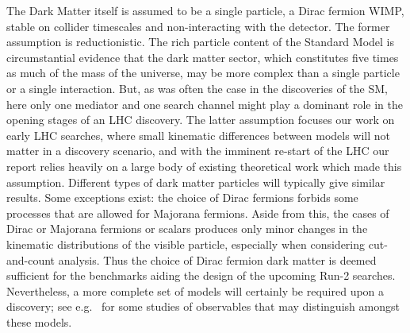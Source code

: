 The Dark Matter itself is assumed to be a single particle, a Dirac
fermion WIMP, stable on collider timescales and non-interacting with
the detector.  
The former assumption is reductionistic.
The rich
particle content of the Standard Model is circumstantial evidence that
the dark matter sector, which constitutes five times as much of the
mass of the universe, may be more complex than a single particle or a
single interaction. But, as was often the case in the discoveries of
the SM, here only one mediator and one search channel might play a
dominant role in the opening stages of an LHC discovery. The latter
assumption focuses our work on early LHC searches, where small
kinematic differences between models will not matter in a discovery
scenario, and with the imminent re-start of the LHC our report relies
heavily on a large body of existing theoretical work which made this
assumption. Different types of dark matter particles will typically
give similar results.
Some exceptions exist:  the choice of Dirac fermions forbids some
processes that are allowed for Majorana fermions.
Aside from this, the cases
of Dirac or Majorana fermions or scalars produces only minor changes
in the kinematic distributions of the visible particle, especially
when considering cut-and-count analysis. Thus the choice of Dirac
fermion dark matter is deemed sufficient for the benchmarks aiding the
design of the upcoming Run-2 searches. Nevertheless, a more complete
set of models will certainly be required upon a discovery; see
e.g.~\cite{Cotta:2012nj,Haisch:2013fla,Crivellin:2015wva} for some
studies of observables that may distinguish amongst these models.


